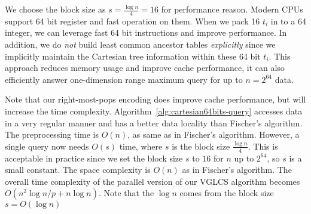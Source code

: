 

We choose the block size as $s = {{\frac{\log n}{4}}} = 16$ for
performance reason.  Modern CPUs support 64 bit register and fast
operation on them.  When we pack 16 $t_i$ in to a 64 integer, we can
leverage fast 64 bit instructions and improve performance.  In
addition, we do {\em not} build least common ancestor tables {\em
  explicitly} since we implicitly maintain the Cartesian tree
information within these 64 bit $t_i$.  This approach reduces memory
usage and improve cache performance, it can also efficiently answer
one-dimension range maximum query for up to $n = 2^{64}$ data.

Note that our right-most-pops encoding does improve cache performance,
but will increase the time complexity.
Algorithm~\ref{alg:cartesian64bits-query} accesses data in a very
regular manner and has a better data locality than Fischer's algorithm.
The preprocessing time is $O(n)$, as same as in Fischer's algorithm.
However, a single query now needs $O(s)$ time, where $s$ is the block
size ${{\frac{\log n}{4}}}$.  This is acceptable in practice since we
set the block size $s$ to $16$ for $n$ up to $2^{64}$, so $s$ is a small
constant.  The space complexity is $O(n)$ as in Fischer's algorithm. The
overall time complexity of the parallel version of our VGLCS algorithm
becomes $O(n^2 \log{n} / p + n \log n)$.  Note that the $\log n$ comes
from the block size $s = O(\log n)$
